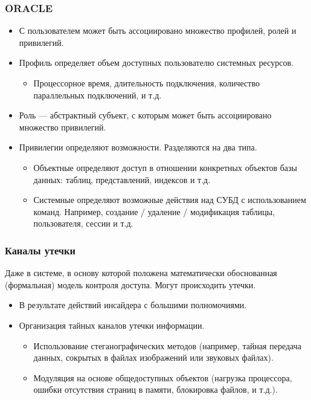 \begin{frame}
    \frametitle{ORACLE}
    
    \begin{itemize}
        \item С \alert{пользователем} может быть ассоциировано множество \alert{профилей}, \alert{ролей} и 
                \alert{привилегий}.
                
        \item \alert{Профиль} определяет объем доступных пользователю системных ресурсов.
        \begin{itemize}
            \item Процессорное время, длительность подключения, количество параллельных подключений, и т.д.
        \end{itemize}
        
        \item \alert{Роль} --- абстрактный субъект, с которым может быть ассоциировано множество \alert{привилегий}.
        
        \item \alert{Привилегии} определяют возможности. Разделяются на два типа.
        \begin{itemize}
            \item \alert{Объектные} определяют доступ в отношении конкретных объектов базы данных: таблиц, 
                представлений, индексов и т.д.
                
            \item \alert{Системные} определяют возможные действия над СУБД с использованием команд. Например, создание / удаление / модификация таблицы, пользователя, сессии и т.д.
        \end{itemize}
    \end{itemize} 
\end{frame}


\appendix


\begin{frame}
    \frametitle{Каналы утечки}

    Даже в системе, в основу которой положена математически обоснованная (формальная) модель контроля доступа. Могут происходить утечки.
    \begin{itemize}
        \item В результате действий инсайдера с большими полномочиями.
        \item Организация тайных каналов утечки информации.
        \begin{itemize}
            \item Использование стеганографических методов (например, тайная передача данных, сокрытых в файлах изображений или звуковых файлах).
            \item Модуляция на основе общедоступных объектов (нагрузка процессора, ошибки отсутствия страниц в памяти, блокировка файлов, и т.д.).
        \end{itemize}
    \end{itemize}
\end{frame}


